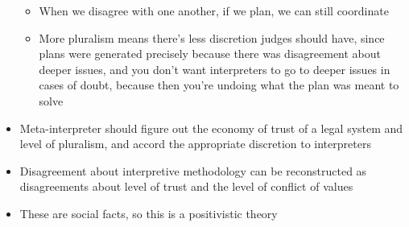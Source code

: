 \begin{itemize}
  \begin{itemize}
  \tightlist
  \item
    When we disagree with one another, if we plan, we can still
    coordinate
  \item
    More pluralism means there's less discretion judges should have,
    since plans were generated precisely because there was disagreement
    about deeper issues, and you don't want interpreters to go to deeper
    issues in cases of doubt, because then you're undoing what the plan
    was meant to solve
  \end{itemize}
\item
  Meta-interpreter should figure out the economy of trust of a legal
  system and level of pluralism, and accord the appropriate discretion
  to interpreters
\item
  Disagreement about interpretive methodology can be reconstructed as
  disagreements about level of trust and the level of conflict of values
\item
  These are social facts, so this is a positivistic theory
\end{itemize}

